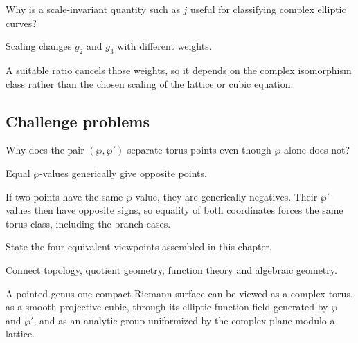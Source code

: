 \begin{exercise}\label{exr:iv31-expand-14}
Why is a scale-invariant quantity such as \(j\) useful for classifying complex elliptic curves?
\end{exercise}
\begin{hint}
Scaling changes \(g_2\) and \(g_3\) with different weights.
\end{hint}
\begin{solution}
A suitable ratio cancels those weights, so it depends on the complex isomorphism class rather than the chosen scaling of the lattice or cubic equation.
\end{solution}

\subsection*{Challenge problems}

\begin{exercise}\label{exr:iv31-expand-15}
Why does the pair \((\wp,\wp')\) separate torus points even though \(\wp\) alone does not?
\end{exercise}
\begin{hint}
Equal \(\wp\)-values generically give opposite points.
\end{hint}
\begin{solution}
If two points have the same \(\wp\)-value, they are generically negatives. Their \(\wp'\)-values then have opposite signs, so equality of both coordinates forces the same torus class, including the branch cases.
\end{solution}

\begin{exercise}\label{exr:iv31-expand-16}
State the four equivalent viewpoints assembled in this chapter.
\end{exercise}
\begin{hint}
Connect topology, quotient geometry, function theory and algebraic geometry.
\end{hint}
\begin{solution}
A pointed genus-one compact Riemann surface can be viewed as a complex torus, as a smooth projective cubic, through its elliptic-function field generated by \(\wp\) and \(\wp'\), and as an analytic group uniformized by the complex plane modulo a lattice.
\end{solution}


